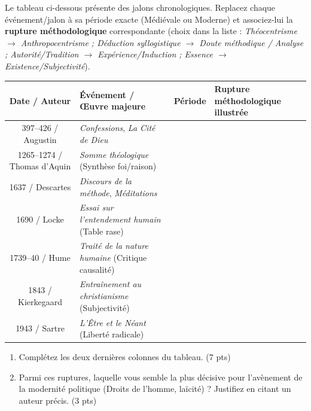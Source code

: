 \documentclass[11pt]{article}
\begin{document}
\begin{exercice}
Le tableau ci-dessous présente des jalons chronologiques. Replacez chaque événement/jalon à sa période exacte (Médiévale ou Moderne) et associez-lui la \textbf{rupture méthodologique} correspondante (choix dans la liste : \textit{Théocentrisme $\to$ Anthropocentrisme ; Déduction syllogistique $\to$ Doute méthodique / Analyse ; Autorité/Tradition $\to$ Expérience/Induction ; Essence $\to$ Existence/Subjectivité}).

\begin{tabularx}{\linewidth}{|c|>{\raggedright\arraybackslash}X|>{\centering\arraybackslash}X|>{\raggedright\arraybackslash}X|}
\hline
\textbf{Date / Auteur} & \textbf{Événement / Œuvre majeure} & \textbf{Période} & \textbf{Rupture méthodologique illustrée} \\
\hline
397--426 / Augustin & \textit{Confessions}, \textit{La Cité de Dieu} & & \\
\hline
1265--1274 / Thomas d'Aquin & \textit{Somme théologique} (Synthèse foi/raison) & & \\
\hline
1637 / Descartes & \textit{Discours de la méthode}, \textit{Méditations} & & \\
\hline
1690 / Locke & \textit{Essai sur l'entendement humain} (Table rase) & & \\
\hline
1739--40 / Hume & \textit{Traité de la nature humaine} (Critique causalité) & & \\
\hline
1843 / Kierkegaard & \textit{Entraînement au christianisme} (Subjectivité) & & \\
\hline
1943 / Sartre & \textit{L'Être et le Néant} (Liberté radicale) & & \\
\hline
\end{tabularx}

\begin{enumerate}
    \item Complétez les deux dernières colonnes du tableau. (7 pts)
    \item Parmi ces ruptures, laquelle vous semble la plus décisive pour l'avènement de la modernité politique (Droits de l'homme, laïcité) ? Justifiez en citant un auteur précis. (3 pts)
\end{enumerate}
\end{exercice}
\end{document}
